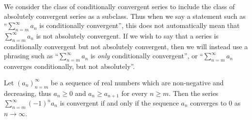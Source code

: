 \begin{remark}\label{7.2.11}
We consider the class of conditionally convergent series to include the class of absolutely convergent series as a subclass.
Thus when we say a statement such as ``\(\sum_{n = m}^\infty a_n\) is conditionally convergent'', this does not automatically mean that \(\sum_{n = m}^\infty a_n\) is not absolutely convergent.
If we wish to say that a series is conditionally convergent but not absolutely convergent, then we will instead use a phrasing such as ``\(\sum_{n = m}^\infty a_n\) is \emph{only} conditionally convergent'', or ``\(\sum_{n = m}^\infty a_n\) converges conditionally, but not absolutely''.
\end{remark}

\begin{proposition}\label{7.2.12}
Let \((a_n)_{n = m}^\infty\) be a sequence of real numbers which are non-negative and decreasing, thus \(a_n \geq 0\) and \(a_n \geq a_{n + 1}\) for every \(n \geq m\).
Then the series \(\sum_{n = m}^\infty (-1)^n a_n\) is convergent if and only if the sequence \(a_n\) converges to \(0\) as \(n \to \infty\).
\end{proposition}

